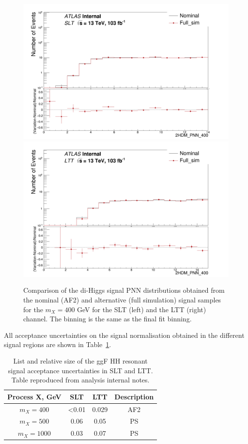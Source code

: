 \begin{figure}
  \centering
  \includegraphics[width=.49\textwidth]{figures/lephad_modelling_systs/SLT/signal_AF2_check/limit_binning_2HDM_PNN_400_Norm.png}
  \includegraphics[width=.49\textwidth]{figures/lephad_modelling_systs/LTT/signal_AF2_check/limit_binning_2HDM_PNN_400_Norm.png}
  \caption{Comparison of the di-Higgs \lephad signal PNN distributions obtained from the nominal (AF2)
    and alternative (full simulation) signal samples for the  $m_X= 400$ GeV for the
    SLT (left) and the LTT (right) channel. The binning is the same as the final fit binning.
  }
  \label{fig:Lephad_resonant_AF2_VS_FS}
\end{figure}


All acceptance uncertainties on the signal normalisation obtained 
in the different signal regions are shown in 
Table~\ref{sec:systs:tab:systematics_HHSignal_AcceptanceNumbers}.  
\begin{table}
\centering
\small
\begin{tabular}{|c|c|c|c|}
\hline
Process X, GeV & SLT  & LTT & Description\\
\hline
$m_{X}= 400$  &  <0.01 & 0.029 & AF2\\
$m_{X}= 500$  &  0.06 & 0.05 & PS\\
$m_{X}= 1000$  &  0.03 &  0.07 & PS\\
\hline
\end{tabular}
\caption{List and relative size of the ggF HH resonant signal acceptance uncertainties in SLT and LTT.
Table reproduced from analysis internal notes.}
\label{sec:systs:tab:systematics_HHSignal_AcceptanceNumbers}
\end{table}










